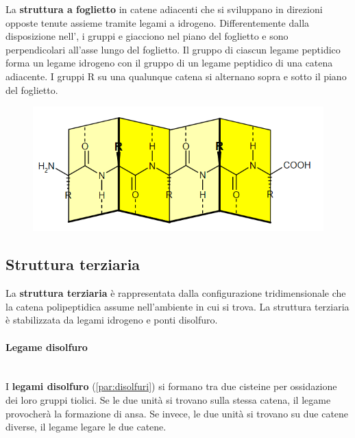 \begin{minipage}{.55\textwidth}
	La \textbf{struttura a foglietto } in catene adiacenti che si sviluppano in direzioni opposte tenute assieme tramite legami a idrogeno. Differentemente dalla disposizione nell’, i gruppi  e  giacciono nel piano del foglietto e sono perpendicolari all’asse lungo del foglietto. Il gruppo  di ciascun legame peptidico forma un legame idrogeno con il gruppo  di un legame peptidico di una catena adiacente. I gruppi R su una qualunque catena si alternano sopra e sotto il piano del foglietto.
\end{minipage}
\begin{minipage}{.4\textwidth}
	\begin{figure}[H]
		\centering
		\vspace{-10pt}
		\includegraphics[scale=0.5]{immagini/Code_IL8tmGoF4t.png}
	\end{figure}
\end{minipage}

\subsection{Struttura terziaria}
La \textbf{struttura terziaria} è rappresentata dalla configurazione tridimensionale che la catena polipeptidica assume nell'ambiente in cui si trova. La struttura terziaria è stabilizzata da legami idrogeno e ponti disolfuro.


\paragraph{Legame disolfuro}\mbox{}\\
I \textbf{legami disolfuro} (\autoref{par:disolfuri}) si formano tra due cisteine per ossidazione dei loro gruppi tiolici. Se le due unità si trovano sulla stessa catena, il legame provocherà la formazione di ansa. Se invece, le due unità si trovano su due catene diverse, il legame legare le due catene.

